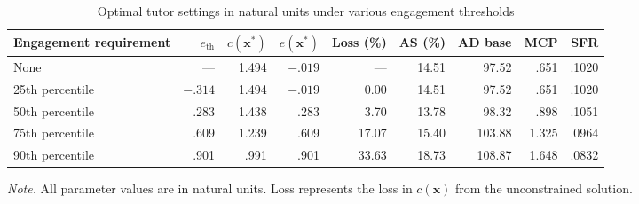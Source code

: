 \documentclass[12pt]{article}
\begin{document}
\begin{table}[htbp]
    \centering
    \caption{Optimal tutor settings in natural units under various
    engagement thresholds}
    \label{tab:constrained-optima-natural}
    \begin{threeparttable}
        \begin{tabular}{lrrrrrrrr}
            \toprule
            Engagement requirement
            & $e_{\mathrm{th}}$
            & $c(\mathbf{x}^{*})$
            & $e(\mathbf{x}^{*})$
            & Loss (\%)
            & AS (\%)
            & AD base
            & MCP
            & SFR \\
            \midrule
            None
                & ---     & 1.494 & $-.019$ & ---
                & 14.51 & 97.52 & .651 & .1020 \\

            25th percentile
                & $-.314$ & 1.494 & $-.019$ & 0.00
                & 14.51 & 97.52 & .651 & .1020 \\

            50th percentile
                & .283 & 1.438 & .283 & 3.70
                & 13.78 & 98.32 & .898 & .1051 \\

            75th percentile
                & .609 & 1.239 & .609 & 17.07
                & 15.40 & 103.88 & 1.325 & .0964 \\

            90th percentile
                & .901 & .991 & .901 & 33.63
                & 18.73 & 108.87 & 1.648 & .0832 \\
            \bottomrule
        \end{tabular}
            \begin{tablenotes}[flushleft]
            \footnotesize
            \item \textit{Note.} All parameter values are in natural units. Loss represents the loss in $c(\textbf{x})$ from the unconstrained solution.
        \end{tablenotes}
    \end{threeparttable}
\end{table}
\end{document}
